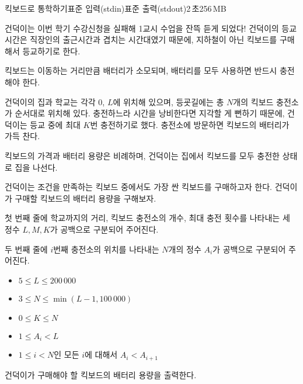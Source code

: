 \begin{problem}{킥보드로 통학하기}{표준 입력(stdin)}{표준 출력(stdout)}{2\,초}{256\,MB}

건덕이는 이번 학기 수강신청을 실패해 1교시 수업을 잔뜩 듣게 되었다! 건덕이의 등교시간은 직장인의 출근시간과 겹치는 시간대였기 때문에, 지하철이 아닌 킥보드를 구매해서 등교하기로 한다.

킥보드는 이동하는 거리만큼 배터리가 소모되며, 배터리를 모두 사용하면 반드시 충전해야 한다.

건덕이의 집과 학교는 각각 $0$, $L$에 위치해 있으며, 등굣길에는 총 $N$개의 킥보드 충전소가 순서대로 위치해 있다. 충전하느라 시간을 낭비한다면 지각할 게 뻔하기 때문에, 건덕이는 등교 중에 최대 $K$번 충전하기로 했다. 충전소에 방문하면 킥보드의 배터리가 가득 찬다.

킥보드의 가격과 배터리 용량은 비례하며, 건덕이는 집에서 킥보드를 모두 충전한 상태로 집을 나선다. 

건덕이는 조건을 만족하는 킥보드 중에서도 가장 싼 킥보드를 구매하고자 한다. 건덕이가 구매할 킥보드의 배터리 용량을 구해보자. 

\InputFile
첫 번째 줄에 학교까지의 거리, 킥보드 충전소의 개수, 최대 충전 횟수를 나타내는 세 정수 $L, M, K$가 공백으로 구분되어 주어진다.

두 번째 줄에 $i$번째 충전소의 위치를 나타내는 $N$개의 정수 $A_i$가 공백으로 구분되어 주어진다.

\begin{itemize}
 \item $5 ≤ L ≤ 200\,000$

 \item $3 ≤ N ≤ \min(L - 1, 100\,000)$

 \item $0 ≤ K ≤ N$

 \item $1 ≤ A_i < L$

 \item $1 ≤ i < N$인 모든 $i$에 대해서 $A_i < A_{i+1}$
\end{itemize}


\OutputFile
건덕이가 구매해야 할 킥보드의 배터리 용량을 출력한다.

\Examples

\begin{example}
%
%
\end{example}

\end{problem}
